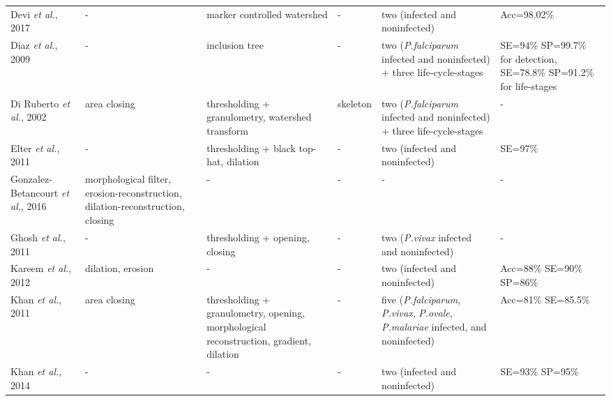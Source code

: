 \begin{longtable}{C{2.1cm} C{2.1cm} C{2.3cm} C{1.5cm} C{2.7cm} C{2.2cm} }
    Devi \emph{et al.}, 2017 &
		- &
		marker controlled watershed &	
		- &
		two (infected and noninfected)  &
		Acc=98.02\%
		\vspace{0.6cm}
        \\

    Diaz \emph{et al.}, 2009 &
		- &
		inclusion tree &	
		- &
		two (\emph{P.falciparum} infected and noninfected) + three life-cycle-stages &
		SE=94\% SP=99.7\% for detection, SE=78.8\% SP=91.2\% for life-stages
\vspace{0.6cm}
		\\

    Di Ruberto \emph{et al.}, 2002 &
		area closing &
		thresholding + granulometry, watershed  transform &	
		skeleton &
		two (\emph{P.falciparum} infected and noninfected) + three life-cycle-stages &
		-
\vspace{0.6cm}
		\\

    Elter \emph{et al.}, 2011 &
		- &
		thresholding + black top-hat, dilation &	
		- &
		two (infected and noninfected) &
		SE=97\%
		\vspace{0.6cm} \\

    Gonzalez-Betancourt \emph{et al.}, 2016  &
    	morphological filter, erosion-reconstruction, dilation-reconstruction, closing &
    	-  &
    	- &
    	- &
    	- \vspace{0.6cm} \\	

    Ghosh \emph{et al.}, 2011  &
    	- &
    	thresholding + opening, closing  &
    	- &
    	two (\emph{P.vivax} infected and noninfected) &
    	- \vspace{0.6cm} \\

    Kareem \emph{et al.}, 2012  &
    	dilation, erosion &
    	-  &
    	- &
    	two (infected and noninfected) &
    	Acc=88\% SE=90\% SP=86\% \vspace{0.6cm} \\	

    Khan \emph{et al.}, 2011  &
    	area closing &
    	thresholding + granulometry, opening, morphological reconstruction, gradient, dilation &
    	- &
    	five (\emph{P.falciparum}, \emph{P.vivax}, \emph{P.ovale}, \emph{P.malariae} infected, and noninfected) &
    	Acc=81\% SE=85.5\% \vspace{0.6cm} \\	

    Khan \emph{et al.}, 2014  &
    	- &
    	- &
    	- &
    	two (infected and noninfected) &
    	SE=93\% SP=95\% \vspace{0.6cm} \\	


\end{longtable}

